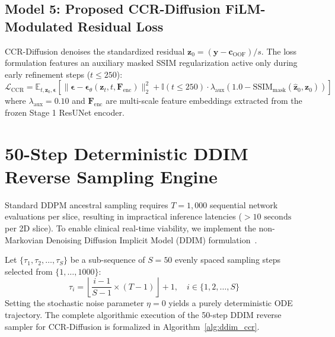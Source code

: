 \subsection{Model 5: Proposed CCR-Diffusion FiLM-Modulated Residual Loss}
CCR-Diffusion denoises the standardized residual $\mathbf{z}_0 = (\mathbf{y} - \mathbf{c}_{\text{OOF}}) / s$. The loss formulation features an auxiliary masked SSIM regularization active only during early refinement steps ($t \le 250$):
\begin{equation}
\mathcal{L}_{\text{CCR}} = \mathbb{E}_{t, \mathbf{z}_0, \boldsymbol{\epsilon}} \left[ \|\boldsymbol{\epsilon} - \boldsymbol{\epsilon}_\theta(\mathbf{z}_t, t, \mathbf{F}_{\text{enc}})\|_2^2 + \mathbb{I}(t \le 250) \cdot \lambda_{\text{aux}} (1.0 - \text{SSIM}_{\text{mask}}(\mathbf{\hat{z}}_0, \mathbf{z}_0)) \right]
\label{eq:impl_m5_loss}
\end{equation}
where $\lambda_{\text{aux}} = 0.10$ and $\mathbf{F}_{\text{enc}}$ are multi-scale feature embeddings extracted from the frozen Stage 1 ResUNet encoder.

\section{50-Step Deterministic DDIM Reverse Sampling Engine}
Standard DDPM ancestral sampling requires $T = 1,000$ sequential network evaluations per slice, resulting in impractical inference latencies ($> 10\text{ seconds}$ per 2D slice). To enable clinical real-time viability, we implement the non-Markovian Denoising Diffusion Implicit Model (DDIM) formulation~\cite{song2021denoising}.

Let $\{\tau_1, \tau_2, \dots, \tau_S\}$ be a sub-sequence of $S = 50$ evenly spaced sampling steps selected from $\{1, \dots, 1000\}$:
\begin{equation}
\tau_i = \left\lfloor \frac{i-1}{S-1} \times (T - 1) \right\rfloor + 1, \quad i \in \{1, 2, \dots, S\}
\label{eq:tau_subsequence}
\end{equation}
Setting the stochastic noise parameter $\eta = 0$ yields a purely deterministic ODE trajectory. The complete algorithmic execution of the 50-step DDIM reverse sampler for CCR-Diffusion is formalized in Algorithm~\ref{alg:ddim_ccr}.

